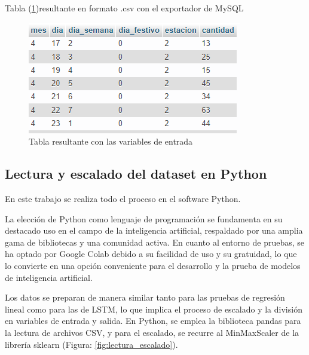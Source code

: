 Tabla (\ref{fig:tabla_resultante})resultante en formato .csv con el exportador de MySQL
\begin{figure}[H]
  \begin{center}
    \includegraphics[scale=0.90]{./tabla_resultante.png}
    \caption{Tabla resultante con las variables de entrada}
    \label{fig:tabla_resultante}
  \end{center}
\end{figure}


\subsection{Lectura y escalado del dataset en Python}
En este trabajo se realiza todo el proceso en el software Python.

\vspace{1\baselineskip}
La elección de Python como lenguaje de programación se fundamenta en su destacado uso en el campo de la inteligencia artificial, respaldado por una amplia gama de bibliotecas y una comunidad activa\cite{mirjalili2020python}. En cuanto al entorno de pruebas, se ha optado por Google Colab debido a su facilidad de uso y su gratuidad, lo que lo convierte en una opción conveniente para el desarrollo y la prueba de modelos de inteligencia artificial.

\vspace{1\baselineskip}
Los datos se preparan de manera similar tanto para las pruebas de regresión lineal como para las de LSTM, lo que implica el proceso de escalado y la división en variables de entrada y salida. En Python, se emplea la biblioteca pandas para la lectura de archivos CSV, y para el escalado, se recurre al MinMaxScaler de la librería sklearn (Figura: \ref{fig:lectura_escalado}).

